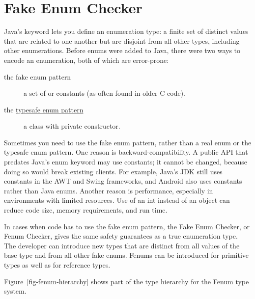 \htmlhr
\chapter{Fake Enum Checker\label{fenum-checker}}

Java's
\href{https://docs.oracle.com/javase/specs/jls/se8/html/jls-8.html#jls-8.9}{}
keyword lets you define an enumeration type: a finite set of distinct values
that are related to one another but are disjoint from all other
types, including other enumerations.
Before enums were added to Java, there were two ways to encode an
enumeration, both of which are error-prone:

\begin{description}
\item[the fake enum pattern]  a set of  or 
  constants (as often found in older C code).

\item[the \href{http://www.oracle.com/technetwork/java/page1-139488.html}{typesafe
enum pattern}]  a class with private constructor.
\end{description}

Sometimes you need to use the fake enum pattern,
rather than a real enum or the typesafe enum pattern.
%
One reason is backward-compatibility.  A public API that predates Java's
enum keyword may use  constants; it cannot be changed, because
doing so would break existing clients.  For example, Java's JDK still uses
 constants in the AWT and Swing frameworks, and Android also uses
 constants rather than Java enums.
%
Another reason is performance, especially in environments with limited
resources.  Use of an int instead of an object can
reduce code size, memory requirements, and run time.

In cases when code has to use the fake enum pattern, the Fake Enum Checker,
or Fenum Checker, gives the same safety guarantees as a true enumeration type.
The developer can introduce new types that are distinct from all values of the
base type and from all other fake enums. Fenums can be introduced for
primitive types as well as for reference types.

Figure~\ref{fig-fenum-hierarchy} shows part of the type hierarchy for the
Fenum type system.

